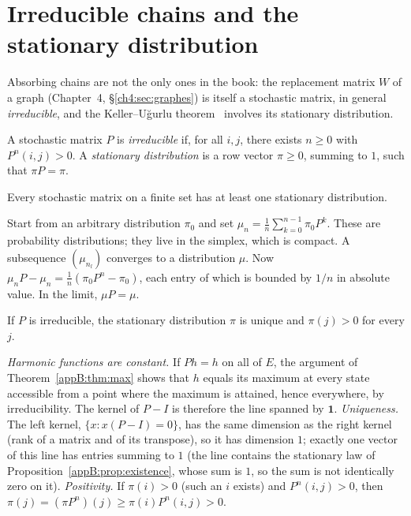 \section{Irreducible chains and the stationary distribution}\label{appB:sec:stat}

Absorbing chains are not the only ones in the book: the replacement matrix $W$ of a graph (Chapter~4,
§\ref{ch4:sec:graphes}) is itself a stochastic matrix, in general \emph{irreducible}, and the
Keller--Uğurlu theorem~\cite{ch4:KU} involves its stationary distribution.

\begin{definition}
A stochastic matrix $P$ is \emph{irreducible} if, for all $i,j$, there exists $n\ge0$ with $P^n(i,j)>0$. A
\emph{stationary distribution} is a row vector $\pi\ge0$, summing to $1$, such that $\pi P=\pi$.
\end{definition}

\begin{proposition}[Existence]\label{appB:prop:existence}
Every stochastic matrix on a finite set has at least one stationary distribution.
\end{proposition}

\begin{humanproof}
Start from an arbitrary distribution $\pi_0$ and set $\mu_n=\frac1n\sum_{k=0}^{n-1}\pi_0P^k$. These are probability
distributions; they live in the simplex, which is compact. A subsequence $(\mu_{n_l})$ converges to a distribution $\mu$.
Now $\mu_nP-\mu_n=\frac1n(\pi_0P^n-\pi_0)$, each entry of which is bounded by $1/n$ in absolute value. In the limit,
$\mu P=\mu$.
\end{humanproof}

\begin{proposition}\label{appB:prop:unicite}
If $P$ is irreducible, the stationary distribution $\pi$ is unique and $\pi(j)>0$ for every $j$.
\end{proposition}

\begin{humanproof}
\emph{Harmonic functions are constant.} If $Ph=h$ on all of $E$, the argument of Theorem~\ref{appB:thm:max}
shows that $h$ equals its maximum at every state accessible from a point where the maximum is attained, hence
everywhere, by irreducibility. The kernel of $P-I$ is therefore the line spanned by $\mathbf 1$.
\emph{Uniqueness.} The left kernel, $\{x:x(P-I)=0\}$, has the same dimension as the right kernel (rank of a matrix and
of its transpose), so it has dimension $1$; exactly one vector of this line has entries summing to $1$ (the line contains the stationary law of Proposition~\ref{appB:prop:existence}, whose sum is $1$, so the sum is not identically zero on it).
\emph{Positivity.} If $\pi(i)>0$ (such an $i$ exists) and $P^n(i,j)>0$, then $\pi(j)=(\pi P^n)(j)\ge\pi(i)P^n(i,j)>0$.
\end{humanproof}

